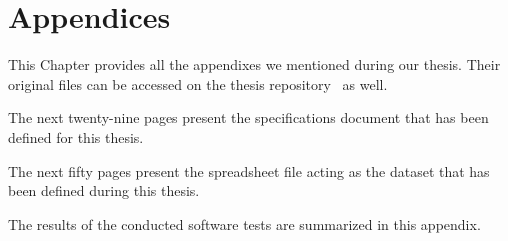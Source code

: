 \chapter{Appendices}

This Chapter provides all the appendixes we mentioned during our thesis. Their original files can be accessed on the thesis repository~\cite{mt-forge} as well.

\label{appendix:specifications}

The next twenty-nine pages present the specifications document that has been defined for this thesis.



\label{appendix:guide}

The next fifty pages present the spreadsheet file acting as the dataset that has been defined during this thesis.



\label{appendix:tests}

\captionsetup[table]{list=no}


The results of the conducted software tests are summarized in this appendix.

